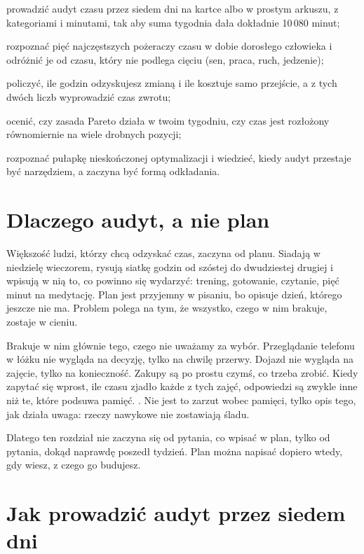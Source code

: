 
\begin{cele}
  \item prowadzić audyt czasu przez siedem dni na kartce albo w prostym arkuszu, z kategoriami i minutami, tak aby suma tygodnia dała dokładnie 10\,080 minut;
  \item rozpoznać pięć najczęstszych pożeraczy czasu w dobie dorosłego człowieka i odróżnić je od czasu, który nie podlega cięciu (sen, praca, ruch, jedzenie);
  \item policzyć, ile godzin odzyskujesz zmianą i ile kosztuje samo przejście, a z tych dwóch liczb wyprowadzić czas zwrotu;
  \item ocenić, czy zasada Pareto działa w twoim tygodniu, czy czas jest rozłożony równomiernie na wiele drobnych pozycji;
  \item rozpoznać pułapkę nieskończonej optymalizacji i wiedzieć, kiedy audyt przestaje być narzędziem, a zaczyna być formą odkładania.
\end{cele}

\section{Dlaczego audyt, a nie plan}

Większość ludzi, którzy chcą odzyskać czas, zaczyna od planu. Siadają w niedzielę wieczorem, rysują siatkę godzin od szóstej do dwudziestej drugiej i wpisują w nią to, co powinno się wydarzyć: trening, gotowanie, czytanie, pięć minut na medytację. Plan jest przyjemny w pisaniu, bo opisuje dzień, którego jeszcze nie ma. Problem polega na tym, że wszystko, czego w nim brakuje, zostaje w cieniu.

Brakuje w nim głównie tego, czego nie uważamy za wybór. Przeglądanie telefonu w łóżku nie wygląda na decyzję, tylko na chwilę przerwy. Dojazd nie wygląda na zajęcie, tylko na konieczność. Zakupy są po prostu czymś, co trzeba zrobić. Kiedy zapytać się wprost, ile czasu zjadło każde z tych zajęć, odpowiedzi są zwykle inne niż te, które podsuwa pamięć. . Nie jest to zarzut wobec pamięci, tylko opis tego, jak działa uwaga: rzeczy nawykowe nie zostawiają śladu.

Dlatego ten rozdział nie zaczyna się od pytania, co wpisać w plan, tylko od pytania, dokąd naprawdę poszedł tydzień. Plan można napisać dopiero wtedy, gdy wiesz, z czego go budujesz.

\section{Jak prowadzić audyt przez siedem dni}


